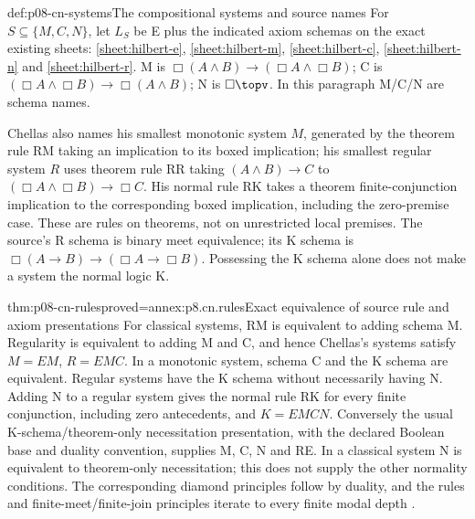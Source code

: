 \begin{hbdefinition}{def:p08-cn-systems}{The compositional systems and source names}
For \(S\subseteq\{M,C,N\}\), let \(L_S\) be E plus the
indicated axiom schemas on the exact existing sheets:
\ref{sheet:hilbert-e}, \ref{sheet:hilbert-m},
\ref{sheet:hilbert-c}, \ref{sheet:hilbert-n} and \ref{sheet:hilbert-r}.
M is \(\Box(A\land B)\to(\Box A\land\Box B)\);
C is \((\Box A\land\Box B)\to\Box(A\land B)\);
N is \(\Box\topv\). In this paragraph M/C/N are schema names.

Chellas also names his smallest monotonic system \(M\), generated
by the theorem rule RM taking an implication to its boxed implication;
his smallest regular system \(R\) uses theorem rule RR taking
\((A\land B)\to C\) to
\((\Box A\land\Box B)\to\Box C\).
His normal rule RK takes a theorem finite-conjunction implication
to the corresponding boxed implication, including the zero-premise
case. These are rules on theorems, not on unrestricted local premises.
The source's R schema is binary meet equivalence; its K schema is
\(\Box(A\to B)\to(\Box A\to\Box B)\).
Possessing the K schema alone does not make a system the normal
logic K.
\end{hbdefinition}

\begin{hbtheorem}{thm:p08-cn-rules}{proved=annex:p8.cn.rules}{Exact equivalence of source rule and axiom presentations}
For classical systems, RM is equivalent to adding schema M.
Regularity is equivalent to adding M and C, and hence
Chellas's systems satisfy \(M=EM\), \(R=EMC\).
In a monotonic system, schema C and the K schema are equivalent.
Regular systems have the K schema without necessarily having N.
Adding N to a regular system gives the normal rule RK for every
finite conjunction, including zero antecedents, and
\(K=EMCN\). Conversely the usual K-schema/theorem-only
necessitation presentation, with the declared Boolean base and
duality convention, supplies M, C, N and RE.
In a classical system N is equivalent to theorem-only necessitation;
this does not supply the other normality conditions.
The corresponding diamond principles follow by duality, and the
rules and finite-meet/finite-join principles iterate to every finite
modal depth \cite[secs.~8.1--8.2, pp.~231--243]{Chellas1980}.
\end{hbtheorem}

